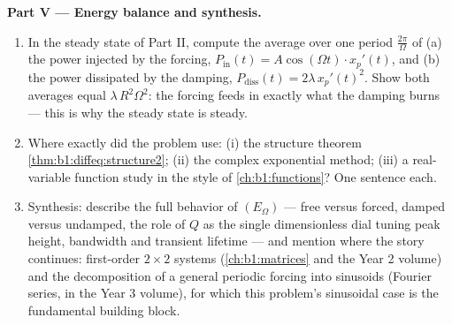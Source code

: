 \begin{problem}
\medskip
\noindent\textbf{Part V --- Energy balance and synthesis.}
\begin{enumerate}[resume]
  \item In the steady state of Part II, compute the average over
        one period $\frac{2\pi}\Omega$ of (a) the power injected
        by the forcing, $P_{\mathrm{in}}(t) = A\cos(\Omega t)
        \cdot x_p'(t)$, and (b) the power dissipated by the
        damping, $P_{\mathrm{diss}}(t) = 2\lambda\,x_p'(t)^2$.
        Show both averages equal $\lambda\,R^2\Omega^2$: the
        forcing feeds in exactly what the damping burns --- this
        is why the steady state is steady.
  \item Where exactly did the problem use: (i) the structure
        theorem \cref{thm:b1:diffeq:structure2}; (ii) the complex
        exponential method; (iii) a real-variable function study
        in the style of \cref{ch:b1:functions}? One sentence
        each.
  \item Synthesis: describe the full behavior  of $(E_\Omega)$
        --- free versus forced, damped versus undamped, the role
        of $Q$ as the single dimensionless dial tuning peak
        height, bandwidth and transient lifetime --- and mention
        where the story continues: first-order $2 \times 2$
        systems (\cref{ch:b1:matrices} and the Year 2 volume) and
        the decomposition of a general periodic forcing into
        sinusoids (Fourier series, in the Year 3 volume), for
        which this problem's sinusoidal case is the fundamental
        building block.
\end{enumerate}
\end{problem}
